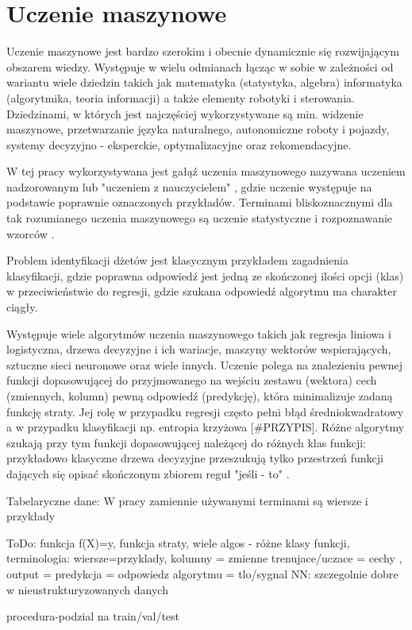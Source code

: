 \clearpage
\section{Uczenie maszynowe}
\label{sec:ml}

Uczenie maszynowe jest bardzo szerokim i obecnie dynamicznie się rozwijającym obszarem wiedzy. Występuje w wielu odmianach łącząc w sobie w zależności od wariantu wiele dziedzin takich jak matematyka (statystyka, algebra) informatyka (algorytmika, teoria informacji) a także elementy robotyki i sterowania. 
Dziedzinami, w których jest najczęściej wykorzystywane są min. widzenie maszynowe, przetwarzanie języka naturalnego, autonomiczne roboty i pojazdy, systemy decyzyjno - eksperckie, optymalizacyjne oraz rekomendacyjne.

W tej pracy wykorzystywana jest gałąź uczenia maszynowego nazywana uczeniem nadzorowanym lub "uczeniem z nauczycielem" , gdzie uczenie występuje na podstawie poprawnie oznaczonych przykładów. Terminami bliskoznacznymi dla tak rozumianego uczenia maszynowego są uczenie statystyczne  i rozpoznawanie wzorców .

Problem identyfikacji dżetów jest klasycznym przykładem zagadnienia klasyfikacji, gdzie poprawna odpowiedź jest jedną ze skończonej ilości opcji (klas) w przeciwieństwie do regresji, gdzie szukana odpowiedź algorytmu ma charakter ciągły. 

Występuje wiele algorytmów uczenia maszynowego takich jak regresja liniowa i logistyczna, drzewa decyzyjne i ich wariacje, maszyny wektorów wspierających, sztuczne sieci neuronowe oraz wiele innych. Uczenie polega na znalezieniu pewnej funkcji dopasowującej do przyjmowanego na wejściu zestawu (wektora) cech (zmiennych, kolumn) pewną odpowiedź (predykcję), która minimalizuje zadaną funkcję straty. Jej rolę w przypadku regresji często pełni błąd średniokwadratowy a w przypadku klasyfikacji np. entropia krzyżowa  [\#PRZYPIS]. 
Różne algorytmy szukają przy tym funkcji dopasowującej należącej do różnych klas funkcji: przykładowo klasyczne drzewa decyzyjne przeszukują tylko przestrzeń funkcji dających się opisać skończonym zbiorem reguł "jeśli - to" .

\vspace{5em}
Tabelaryczne dane:
W pracy zamiennie używanymi terminami są wiersze i przykłady

ToDo: funkcja f(X)=y, funkcja straty, wiele algos - różne klasy funkcji, terminologia: wiersze=przyklady, kolumny = zmienne trenujace/uczace = cechy
, output = predykcja = odpowiedz algorytmu = tlo/sygnal
NN: szczegolnie dobre w nieustrukturyzowanych danych

procedura-podzial na train/val/test



